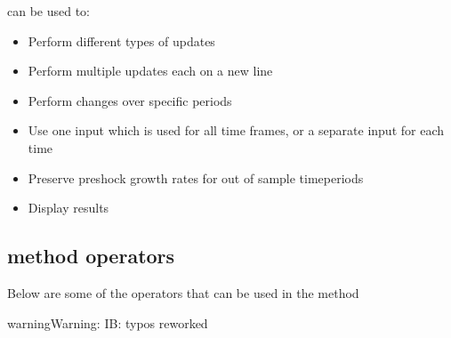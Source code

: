 \documentclass[letterpaper,10pt,english]{jupyterBook}
\begin{document}
\sphinxAtStartPar
{} can be used to:
\begin{itemize}
\item {} 
\sphinxAtStartPar
Perform different types of  updates

\item {} 
\sphinxAtStartPar
Perform multiple updates each on a new line

\item {} 
\sphinxAtStartPar
Perform changes over specific periods

\item {} 
\sphinxAtStartPar
Use one input which is used for all time frames, or a separate input for each time

\item {} 
\sphinxAtStartPar
Preserve pre\sphinxhyphen{}shock growth rates for out of sample time\sphinxhyphen{}periods

\item {} 
\sphinxAtStartPar
Display results

\end{itemize}


\subsection{ method operators}
\label{\detokenize{content/04_PythonEssentials/UpdateCommand:upd-method-operators}}
\sphinxAtStartPar
Below are some of the operators that can be used in the  method

\begin{sphinxadmonition}{warning}{Warning:}
\sphinxAtStartPar
IB: typos reworked
\end{sphinxadmonition}

\sphinxAtStartPar
{}
\end{document}
